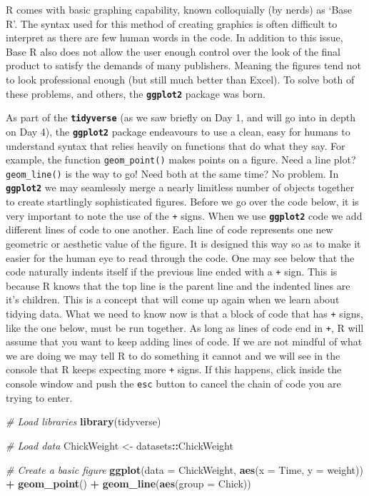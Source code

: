 \documentclass[
]{book}
\newenvironment{Shaded}{\begin{snugshade}}{\end{snugshade}}
\newcommand{\CommentTok}[1]{\textcolor[rgb]{0.56,0.35,0.01}{\textit{#1}}}
\newcommand{\DataTypeTok}[1]{\textcolor[rgb]{0.13,0.29,0.53}{#1}}
\newcommand{\KeywordTok}[1]{\textcolor[rgb]{0.13,0.29,0.53}{\textbf{#1}}}
\newcommand{\NormalTok}[1]{#1}
\newcommand{\OperatorTok}[1]{\textcolor[rgb]{0.81,0.36,0.00}{\textbf{#1}}}
\newcommand{\StringTok}[1]{\textcolor[rgb]{0.31,0.60,0.02}{#1}}
\begin{document}
R comes with basic graphing capability, known colloquially (by nerds) as `Base R'. The syntax used for this method of creating graphics is often difficult to interpret as there are few human words in the code. In addition to this issue, Base R also does not allow the user enough control over the look of the final product to satisfy the demands of many publishers. Meaning the figures tend not to look professional enough (but still much better than Excel). To solve both of these problems, and others, the \textbf{\texttt{ggplot2}} package was born.

As part of the \textbf{\texttt{tidyverse}} (as we saw briefly on Day 1, and will go into in depth on Day 4), the \textbf{\texttt{ggplot2}} package endeavours to use a clean, easy for humans to understand syntax that relies heavily on functions that do what they say. For example, the function \texttt{geom\_point()} makes points on a figure. Need a line plot? \texttt{geom\_line()} is the way to go! Need both at the same time? No problem. In \textbf{\texttt{ggplot2}} we may seamlessly merge a nearly limitless number of objects together to create startlingly sophisticated figures. Before we go over the code below, it is very important to note the use of the \texttt{+} signs. When we use \textbf{\texttt{ggplot2}} code we add different lines of code to one another. Each line of code represents one new geometric or aesthetic value of the figure. It is designed this way so as to make it easier for the human eye to read through the code.
One may see below that the code naturally indents itself if the previous line ended with a \texttt{+} sign. This is because R knows that the top line is the parent line and the indented lines are it's children. This is a concept that will come up again when we learn about tidying data. What we need to know now is that a block of code that has \texttt{+} signs, like the one below, must be run together. As long as lines of code end in \texttt{+}, R will assume that you want to keep adding lines of code. If we are not mindful of what we are doing we may tell R to do something it cannot and we will see in the console that R keeps expecting more \texttt{+} signs. If this happens, click inside the console window and push the \texttt{esc} button to cancel the chain of code you are trying to enter.

\begin{Shaded}
\begin{Highlighting}[]
\CommentTok{\# Load libraries}
\KeywordTok{library}\NormalTok{(tidyverse)}

\CommentTok{\# Load data}
\NormalTok{ChickWeight <{-}}\StringTok{ }\NormalTok{datasets}\OperatorTok{::}\NormalTok{ChickWeight}

\CommentTok{\# Create a basic figure}
\KeywordTok{ggplot}\NormalTok{(}\DataTypeTok{data =}\NormalTok{ ChickWeight, }\KeywordTok{aes}\NormalTok{(}\DataTypeTok{x =}\NormalTok{ Time, }\DataTypeTok{y =}\NormalTok{ weight)) }\OperatorTok{+}
\StringTok{  }\KeywordTok{geom\_point}\NormalTok{() }\OperatorTok{+}
\StringTok{  }\KeywordTok{geom\_line}\NormalTok{(}\KeywordTok{aes}\NormalTok{(}\DataTypeTok{group =}\NormalTok{ Chick))}
\end{Highlighting}
\end{Shaded}
\end{document}
